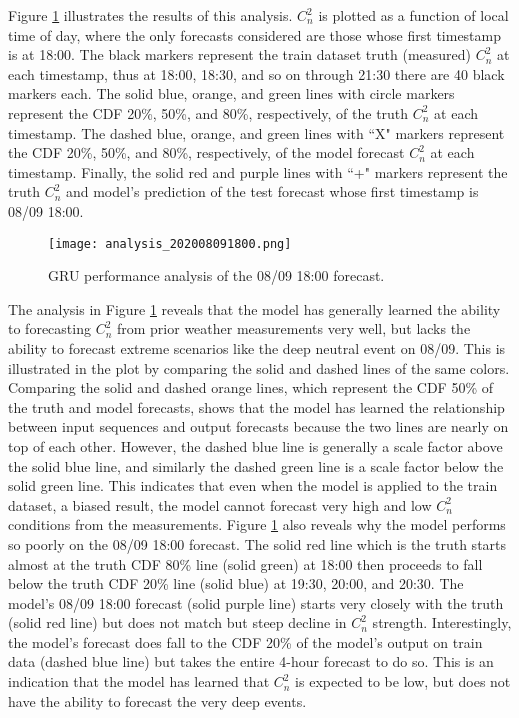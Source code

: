 Figure \ref{fig:analysis_08091800} illustrates the results of this analysis. $C_{n}^{2}$ is plotted as a function of local time of day, where the only forecasts considered are those whose first timestamp is at 18:00. The black markers represent the train dataset truth (measured) $C_{n}^{2}$ at each timestamp, thus at 18:00, 18:30, and so on through 21:30 there are 40 black markers each. The solid blue, orange, and green lines with circle markers represent the CDF 20\%, 50\%, and 80\%, respectively, of the truth $C_{n}^{2}$ at each timestamp. The dashed blue, orange, and green lines with ``X" markers represent the CDF 20\%, 50\%, and 80\%, respectively, of the model forecast $C_{n}^{2}$ at each timestamp. Finally, the solid red and purple lines with ``+" markers represent the truth $C_{n}^{2}$ and model's prediction of the test forecast whose first timestamp is 08/09 18:00.
\begin{figure}[h!]
	\centering
	\texttt{[image: analysis\_202008091800.png]}
	\caption{GRU performance analysis of the 08/09 18:00 forecast.}
	\label{fig:analysis_08091800}
\end{figure}

The analysis in Figure \ref{fig:analysis_08091800} reveals that the model has generally learned the ability to forecasting $C_{n}^{2}$ from prior weather measurements very well, but lacks the ability to forecast extreme scenarios like the deep neutral event on 08/09. This is illustrated in the plot by comparing the solid and dashed lines of the same colors. Comparing the solid and dashed orange lines, which represent the CDF 50\% of the truth and model forecasts, shows that the model has learned the relationship between input sequences and output forecasts because the two lines are nearly on top of each other. However, the dashed blue line is generally a scale factor above the solid blue line, and similarly the dashed green line is a scale factor below the solid green line. This indicates that even when the model is applied to the train dataset, a biased result, the model cannot forecast very high and low $C_{n}^{2}$ conditions from the measurements. Figure \ref{fig:analysis_08091800} also reveals why the model performs so poorly on the 08/09 18:00 forecast. The solid red line which is the truth starts almost at the truth CDF 80\% line (solid green) at 18:00 then proceeds to fall below the truth CDF 20\% line (solid blue) at 19:30, 20:00, and 20:30. The model's 08/09 18:00 forecast (solid purple line) starts very closely with the truth (solid red line) but does not match but steep decline in $C_{n}^{2}$ strength. Interestingly, the model's forecast does fall to the CDF 20\% of the model's output on train data (dashed blue line) but takes the entire 4-hour forecast to do so. This is an indication that the model has learned that $C_{n}^{2}$ is expected to be low, but does not have the ability to forecast the very deep events.

